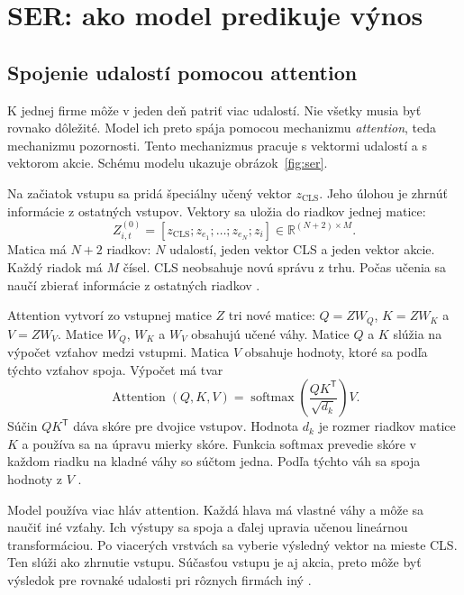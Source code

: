 \section{SER: ako model predikuje výnos}
\subsection{Spojenie udalostí pomocou attention}
K jednej firme môže v jeden deň patriť viac udalostí. Nie všetky musia byť rovnako dôležité. Model ich preto spája pomocou mechanizmu \emph{attention}, teda mechanizmu pozornosti. Tento mechanizmus pracuje s vektormi udalostí a s vektorom akcie. Schému modelu ukazuje obrázok~\ref{fig:ser}.

Na začiatok vstupu sa pridá špeciálny učený vektor $z_{\mathrm{CLS}}$. Jeho úlohou je zhrnúť informácie z ostatných vstupov. Vektory sa uložia do riadkov jednej matice:
\begin{equation}
Z^{(0)}_{i,t}=[z_{\mathrm{CLS}};z_{e_1};\ldots;z_{e_N};z_i]
\in\mathbb{R}^{(N+2)\times M}.
\label{eq:input}
\end{equation}
Matica má $N+2$ riadkov: $N$ udalostí, jeden vektor CLS a jeden vektor akcie. Každý riadok má $M$ čísel. CLS neobsahuje novú správu z trhu. Počas učenia sa naučí zbierať informácie z ostatných riadkov .



Attention vytvorí zo vstupnej matice $Z$ tri nové matice: $Q=ZW_Q$, $K=ZW_K$ a $V=ZW_V$. Matice $W_Q$, $W_K$ a $W_V$ obsahujú učené váhy. Matice $Q$ a $K$ slúžia na výpočet vzťahov medzi vstupmi. Matica $V$ obsahuje hodnoty, ktoré sa podľa týchto vzťahov spoja. Výpočet má tvar
\begin{equation}
\operatorname{Attention}(Q,K,V)=
\operatorname{softmax}\!\left(\frac{QK^{\mathsf T}}{\sqrt{d_k}}\right)V.
\label{eq:attention}
\end{equation}
Súčin $QK^{\mathsf T}$ dáva skóre pre dvojice vstupov. Hodnota $d_k$ je rozmer riadkov matice $K$ a používa sa na úpravu mierky skóre. Funkcia softmax prevedie skóre v každom riadku na kladné váhy so súčtom jedna. Podľa týchto váh sa spoja hodnoty z $V$ .

Model používa viac hláv attention. Každá hlava má vlastné váhy a môže sa naučiť iné vzťahy. Ich výstupy sa spoja a ďalej upravia učenou lineárnou transformáciou. Po viacerých vrstvách sa vyberie výsledný vektor na mieste CLS. Ten slúži ako zhrnutie vstupu. Súčasťou vstupu je aj akcia, preto môže byť výsledok pre rovnaké udalosti pri rôznych firmách iný .

